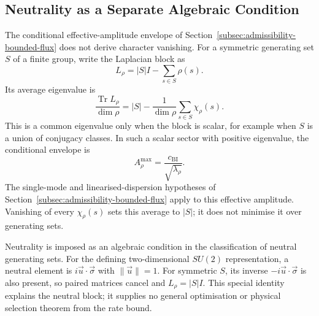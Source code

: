\subsection{Neutrality as a Separate Algebraic Condition}
  \label{subsec:bounded-flux-character-vanishing}

  The conditional effective-amplitude envelope of Section~\ref{subsec:admissibility-bounded-flux}
  does not derive character vanishing.
  For a symmetric generating set $S$ of a finite group, write the Laplacian block as
  \begin{equation}
    L_\rho=|S|I-\sum_{s\in S}\rho(s).
  \end{equation}
  Its average eigenvalue is
  \begin{equation}
    \frac{\operatorname{Tr}L_\rho}{\dim\rho}
    = |S|-\frac{1}{\dim\rho}\sum_{s\in S}\chi_\rho(s).
  \end{equation}
  This is a common eigenvalue only when the block is scalar, for example when $S$ is a union
  of conjugacy classes.
  In such a scalar sector with positive eigenvalue, the conditional envelope is
  \begin{equation}
    A_\rho^{\max}=\frac{c_{\mathrm{BI}}}{\sqrt{\lambda_\rho}}.
    \label{eq:admissibility-envelope-B}
  \end{equation}
  The single-mode and linearised-dispersion hypotheses of Section~\ref{subsec:admissibility-bounded-flux}
  apply to this effective amplitude.
  Vanishing of every $\chi_\rho(s)$ sets this average to $|S|$; it does not minimise it over generating sets.

  Neutrality is imposed as an algebraic condition in the classification of neutral generating sets.
  For the defining two-dimensional $SU(2)$ representation, a neutral element is
  $i\vec u\cdot\vec\sigma$ with $\|\vec u\|=1$.
  For symmetric $S$, its inverse $-i\vec u\cdot\vec\sigma$ is also present, so paired matrices cancel
  and $L_\rho=|S|I$.
  This special identity explains the neutral block; it supplies no general optimisation or physical
  selection theorem from the rate bound.
